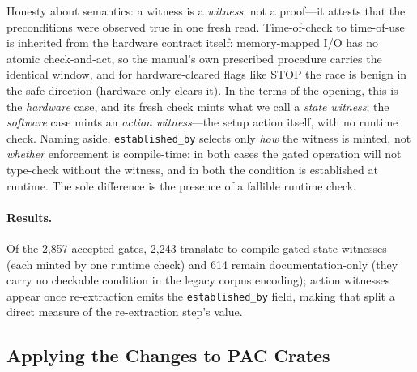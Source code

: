 Honesty about semantics: a witness is a \emph{witness}, not a proof---it
attests that the preconditions were observed true in one fresh read.
Time-of-check to time-of-use is inherited from the hardware contract itself:
memory-mapped I/O has no atomic check-and-act, so the manual's own prescribed
procedure carries the identical window, and for hardware-cleared flags like
STOP the race is benign in the safe direction (hardware only clears it). In the terms of the opening, this is the \emph{hardware} case, and its fresh
check mints what we call a \emph{state witness}; the \emph{software} case
mints an \emph{action witness}---the setup action itself, with no runtime
check. Naming aside, \texttt{established\_by} selects only \emph{how} the
witness is minted, not \emph{whether} enforcement is compile-time: in both
cases the gated operation will not type-check without the witness, and in
both the condition is established at runtime. The sole difference is the
presence of a fallible runtime check.

\paragraph{Results.}
Of the 2{,}857 accepted gates, 2{,}243 translate to compile-gated state
witnesses (each minted by one runtime check) and 614 remain documentation-only
(they carry no checkable condition in the legacy corpus encoding); action
witnesses appear once re-extraction emits the \texttt{established\_by} field,
making that split a direct measure of the re-extraction step's value.

\subsection{Applying the Changes to PAC Crates}
\label{sec:enforcement:pac}

